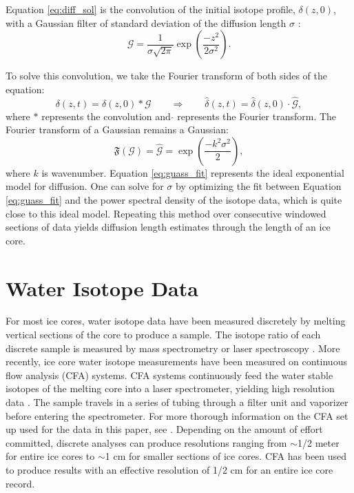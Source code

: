 \documentclass[draft, jgrga]{AGUTeX}
\begin{document}
\begin{article}
Equation \ref{eq:diff_sol} is the convolution of the initial isotope profile, $\delta(z,0)$, with a Gaussian filter of standard deviation of the diffusion length $\sigma$ \citep{Johnsen2000}:
\begin{equation}
\mathcal{G} = \frac{1}{\sigma \sqrt{2\pi}} \exp \left( \frac{-z^2}{2\sigma^2} \right).
\end{equation}

To solve this convolution, we take the Fourier transform of both sides of the equation:
\begin{equation}
  \delta(z,t) = \delta(z,0)*\mathcal{G} \qquad \Rightarrow \qquad \hat{\delta}(z,t) = \hat{\delta}(z,0) \cdot \hat{\mathcal{G}},
\end{equation}
where $*$ represents the convolution and \quad $\hat{}$ \quad represents the Fourier transform. The Fourier transform of a Gaussian remains a Gaussian:
\begin{equation}
  \label{eq:guass_fit}
\mathfrak{F}(\mathcal{G}) = \hat{\mathcal{G}} = \exp \left( \frac{-k^2\sigma^2}{2} \right),
\end{equation}
where $k$ is wavenumber. Equation \ref{eq:guass_fit} represents the ideal exponential model for diffusion. One can solve for $\sigma$ by optimizing the fit between Equation \ref{eq:guass_fit} and the power spectral density of the isotope data, which is quite close to this ideal model. Repeating this method over consecutive windowed sections of data yields diffusion length estimates through the length of an ice core.


\section{Water Isotope Data}

For most ice cores, water isotope data have been measured discretely by melting vertical sections of the core to produce a sample. The isotope ratio of each discrete sample is measured by mass spectrometry or laser spectroscopy \citep{Kerstel1999, Lis2008, Gupta2009, Brand2009}. More recently, ice core water isotope measurements have been measured on continuous flow analysis (CFA) systems. CFA systems continuously feed the water stable isotopes of the melting core into a laser spectrometer, yielding high resolution data \citep{Gkinis2011a,Emanuelsson2015,Jones2017b}. The sample travels in a series of tubing through a filter unit and vaporizer before entering the spectrometer. For more thorough information on the CFA set up used for the data in this paper, see \citet{Jones2017b}. Depending on the amount of effort committed, discrete analyses can produce resolutions ranging from $\sim$1/2 meter for entire ice cores to $\sim$1 cm for smaller sections of ice cores. CFA has been used to produce results with an effective resolution of 1/2 cm for an entire ice core record.


\end{article}
\end{document}
